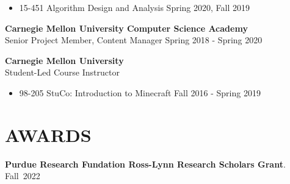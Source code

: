 \documentclass[margin, 10pt]{res} %
\begin{document}
\begin{resume}
\begin{itemize}
\item 15-451 Algorithm Design and Analysis \hfill Spring 2020, Fall 2019
\end{itemize}

{\bf Carnegie Mellon University Computer Science Academy}\\
Senior Project Member, Content Manager \hfill Spring 2018 - Spring 2020

{\bf Carnegie Mellon University}\\
Student-Led Course Instructor

\begin{itemize}
\item 98-205 StuCo: Introduction to Minecraft \hfill Fall 2016 - Spring 2019
\end{itemize}

\section{AWARDS}
{\bf Purdue Research Fundation Ross-Lynn Research Scholars Grant}. \hfill Fall~2022


\end{resume}
\end{document}
